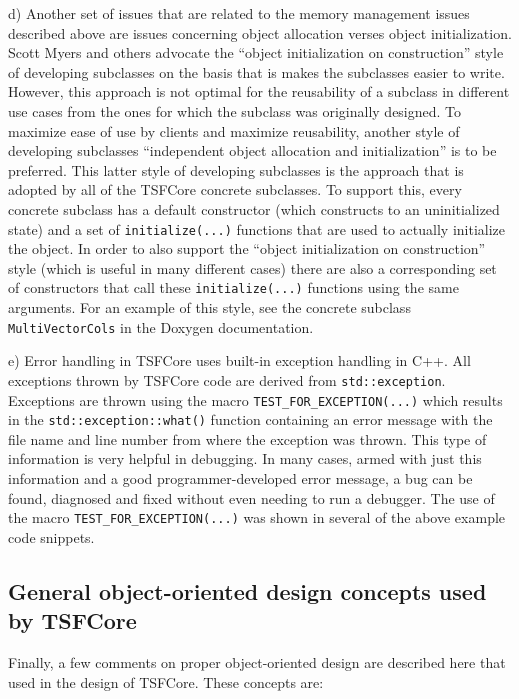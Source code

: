 d) Another set of issues that are related to the memory management
issues described above are issues concerning object allocation verses
object initialization.  Scott Myers {}\cite{ref:meyers_1996} and
others advocate the ``object initialization on construction'' style of
developing subclasses on the basis that is makes the subclasses easier
to write.  However, this approach is not optimal for the reusability
of a subclass in different use cases from the ones for which the
subclass was originally designed.  To maximize ease of use by clients
and maximize reusability, another style of developing subclasses
``independent object allocation and initialization'' is to be
preferred.  This latter style of developing subclasses is the approach
that is adopted by all of the TSFCore concrete subclasses.  To support
this, every concrete subclass has a default constructor (which
constructs to an uninitialized state) and a set of
{}\texttt{initialize(...)}  functions that are used to actually
initialize the object.  In order to also support the ``object
initialization on construction'' style (which is useful in many
different cases) there are also a corresponding set of constructors
that call these {}\texttt{initialize(...)} functions using the same
arguments.  For an example of this style, see the concrete subclass
{}\texttt{MultiVectorCols} in the Doxygen documentation.

e) Error handling in TSFCore uses built-in exception handling in C++.
All exceptions thrown by TSFCore code are derived from
{}\texttt{std::exception}.  Exceptions are thrown using the macro
{}\texttt{TEST\-\_FOR\-\_EXCEPTION(...)} which results in the
{}\texttt{std::exception::what()} function containing an error message
with the file name and line number from where the exception was
thrown.  This type of information is very helpful in debugging.  In
many cases, armed with just this information and a good
programmer-developed error message, a bug can be found, diagnosed and
fixed without even needing to run a debugger.  The use of the macro
{}\texttt{TEST\-\_FOR\-\_EXCEPTION(...)} was shown in several of the
above example code snippets.

%
\subsection{General object-oriented design concepts used by TSFCore}
\label{tsfcore:sec:good-oo-design}
%

Finally, a few comments on proper object-oriented design are described
here that used in the design of TSFCore.  These concepts are:

